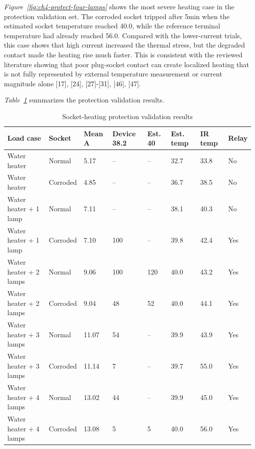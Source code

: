 \textit{Figure~\ref{fig:ch4-protect-four-lamps}} shows the most severe heating
case in the protection validation set. The corroded socket tripped after 5min
when the estimated socket temperature reached 40.0{\degreeC}, while the
reference terminal temperature had already reached 56.0{\degreeC}. Compared
with the lower-current trials, this case shows that high current increased the
thermal stress, but the degraded contact made the heating rise much faster. This
is consistent with the reviewed literature showing that poor plug-socket contact
can create localized heating that is not fully represented by external
temperature measurement or current magnitude alone [17], [24], [27]-[31],
[46], [47].

\textit{Table~\ref{tab:ch4-heating-protection}} summarizes the protection
validation results.

\begin{table}[H]
  \centering
  \caption{Socket-heating protection validation results}
  \label{tab:ch4-heating-protection}
  \small
  \setlength{\tabcolsep}{3pt}
  \begin{tabular}{@{}p{}p{}p{}p{}p{}p{}p{}p{}@{}}
    \toprule
    \textbf{Load case} & \textbf{Socket} & \textbf{Mean A} & \textbf{Device 38.2} & \textbf{Est. 40} & \textbf{Est. temp} & \textbf{IR temp} & \textbf{Relay} \\
    \midrule
    Water heater & Normal & 5.17 & -- & -- & 32.7 & 33.8 & No \\
    Water heater & Corroded & 4.85 & -- & -- & 36.7 & 38.5 & No \\
    Water heater + 1 lamp & Normal & 7.11 & -- & -- & 38.1 & 40.3 & No \\
    Water heater + 1 lamp & Corroded & 7.10 & 100 & -- & 39.8 & 42.4 & Yes \\
    Water heater + 2 lamps & Normal & 9.06 & 100 & 120 & 40.0 & 43.2 & Yes \\
    Water heater + 2 lamps & Corroded & 9.04 & 48 & 52 & 40.0 & 44.1 & Yes \\
    Water heater + 3 lamps & Normal & 11.07 & 54 & -- & 39.9 & 43.9 & Yes \\
    Water heater + 3 lamps & Corroded & 11.14 & 7 & -- & 39.7 & 55.0 & Yes \\
    Water heater + 4 lamps & Normal & 13.02 & 44 & -- & 39.9 & 45.0 & Yes \\
    Water heater + 4 lamps & Corroded & 13.08 & 5 & 5 & 40.0 & 56.0 & Yes \\
    \bottomrule
  \end{tabular}
\end{table}

